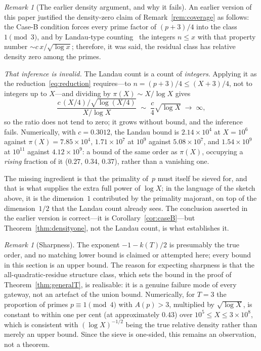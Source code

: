 \documentclass[12pt]{amsart}
\theoremstyle{definition}
\theoremstyle{remark}
\newtheorem{remark}[theorem]{Remark}
\begin{document}
\begin{remark}[The earlier density argument, and why it fails]
\label{rem:landau-gap}
An earlier version of this paper justified the density-zero claim of
Remark~\ref{rem:coverage} as follows: the Case-B condition forces every
prime factor of $(p+3)/4$ into the class $1 \pmod 3$, and by
Landau-type counting~\cite[Ch.~II.5]{Tenenbaum2015} the integers
$n \leq x$ with that property number $\sim c\,x/\sqrt{\log x}$;
therefore, it was said, the residual class has relative density zero
among the primes.

\emph{That inference is invalid.}  The Landau count is a count of
\emph{integers}.  Applying it as the reduction~\eqref{eq:reduction}
requires---to $n = (p+3)/4 \leq (X+3)/4$, not to integers up to
$X$---and dividing by $\pi(X) \sim X/\log X$ gives
\[
  \frac{c\,(X/4)/\sqrt{\log (X/4)}}{X/\log X}
  \;\sim\; \frac{c}{4}\sqrt{\log X}
  \;\longrightarrow\; \infty ,
\]
so the ratio does not tend to zero; it grows without bound, and the
inference fails.  Numerically, with $c = 0.3012$, the Landau bound is
$2.14 \times 10^4$ at $X = 10^6$ against $\pi(X) = 7.85 \times 10^4$,
$1.71 \times 10^7$ at $10^9$ against $5.08 \times 10^7$, and
$1.54 \times 10^9$ at $10^{11}$ against $4.12 \times 10^9$: a bound of
the same order as $\pi(X)$, occupying a \emph{rising} fraction of it
($0.27$, $0.34$, $0.37$), rather than a vanishing one.

The missing ingredient is that the primality of~$p$ must itself be
sieved for, and that is what supplies the extra full power of $\log X$;
in the language of the sketch above, it is the dimension~$1$
contributed by the primality majorant, on top of the dimension~$1/2$
that the Landau count already sees.  The conclusion asserted in the
earlier version is correct---it is
Corollary~\ref{cor:caseB}---but Theorem~\ref{thm:densityone}, not the
Landau count, is what establishes it.
\end{remark}

\begin{remark}[Sharpness]\label{rem:sharpness}
The exponent $-1-k(T)/2$ is presumably the true order, and no matching
lower bound is claimed or attempted here; every bound in this section
is an upper bound.  The reason for expecting sharpness is that the
all-quadratic-residue structure class, which sets the bound in the
proof of Theorem~\ref{thm:generalT}, is realisable: it is a genuine
failure mode of every gateway, not an artefact of the union bound.
Numerically, for $T = 3$ the proportion of primes $p \equiv 1 \pmod 4$
with $A(p) > 3$, multiplied by $\sqrt{\log X}$, is constant to within
one per cent (at approximately $0.43$) over $10^5 \leq X \leq
3 \times 10^8$, which is consistent with $(\log X)^{-1/2}$ being the
true relative density rather than merely an upper bound.  Since the
sieve is one-sided, this remains an observation, not a theorem.
\end{remark}
\end{document}
